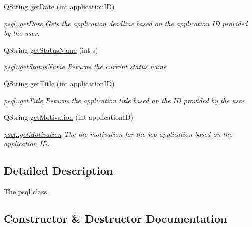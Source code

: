 \begin{DoxyCompactItemize}
Q\+String \mbox{\hyperlink{classpsql_a561f96bfe7e9d092077712dd6b186af8}{get\+Date}} (int application\+ID)
\begin{DoxyCompactList}\small\item\em \mbox{\hyperlink{classpsql_a561f96bfe7e9d092077712dd6b186af8}{psql\+::get\+Date}} Gets the application deadline based on the application ID provided by the user. \end{DoxyCompactList}\item 
Q\+String \mbox{\hyperlink{classpsql_a5c2a64419a68a258071fd1f9a37c7c09}{get\+Status\+Name}} (int s)
\begin{DoxyCompactList}\small\item\em \mbox{\hyperlink{classpsql_a5c2a64419a68a258071fd1f9a37c7c09}{psql\+::get\+Status\+Name}} Returns the current status name \end{DoxyCompactList}\item 
Q\+String \mbox{\hyperlink{classpsql_ada9e3be3e0866011edf53e30ec510afc}{get\+Title}} (int application\+ID)
\begin{DoxyCompactList}\small\item\em \mbox{\hyperlink{classpsql_ada9e3be3e0866011edf53e30ec510afc}{psql\+::get\+Title}} Returns the application title based on the ID provided by the user \end{DoxyCompactList}\item 
Q\+String \mbox{\hyperlink{classpsql_aca1b2273937491e113089c1547caf49b}{get\+Motivation}} (int application\+ID)
\begin{DoxyCompactList}\small\item\em \mbox{\hyperlink{classpsql_aca1b2273937491e113089c1547caf49b}{psql\+::get\+Motivation}} The the motivation for the job application based on the application ID. \end{DoxyCompactList}\end{DoxyCompactItemize}


\subsection{Detailed Description}
The psql class. 

\subsection{Constructor \& Destructor Documentation}
\mbox{\label{classpsql_aaff5fe0931dce097850982e44e6361af}} 
